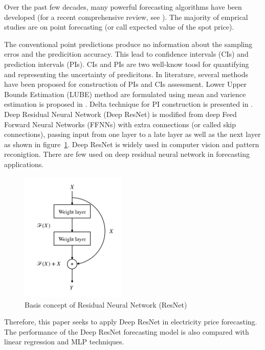 \documentclass[review]{elsarticle}
\begin{document}
    Over the past few decades, many powerful forecasting algorithms have been developed (for a recent comprehensive review, see \cite{Weron2014}). The majority of emprical studies are on point forecasting (or call expected value of the spot price).

    The conventional point predictions produce no information about the sampling erros and the predicition accuracy. This lead to confidence intervals (CIs) and prediction intervals (PIs). CIs and PIs are two well-know toosl for quantifying and representing the uncertainty of predicitons. In literature, several methods have been proposed for construction of PIs and CIs assessment. Lower Upper Bounds Estimation (LUBE) method are formulated using mean and varience estimation is proposed in \cite{Khosravi2011}. Delta technique for PI construction is presented in \cite{KhosraviA2010}.
    Deep Residual Neural Network (Deep ResNet) is modified from deep Feed Forward Neural Networks (FFNNs) with extra connections (or called skip connections), passing input from one layer to a late layer as well as the next layer as shown in figure~\ref{Fig:Basic_DRNN}. Deep ResNet is widely used in computer vision and pattern reconigtion. There are few used on deep residual neural network in forecasting applications.
    \begin{figure}[H]
      \centering
      \includegraphics[width=5cm]{basic_DRNN}
      \caption{Basis concept of Residual Neural Network (ResNet)}
      \label{Fig:Basic_DRNN}
    \end{figure}
    Therefore, this paper seeks to apply Deep ResNet in electricity price forecasting. The performance of the Deep ResNet forecasting model is also compared with linear regression and MLP techniques.
\end{document}
